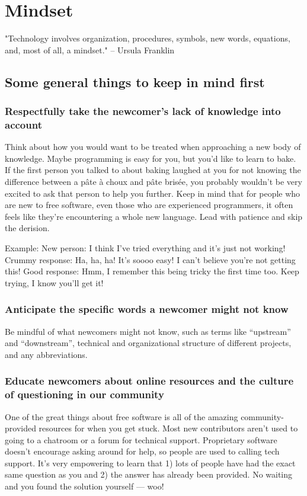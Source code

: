 \chapter{Mindset}

"Technology involves organization, procedures, symbols, new words, equations, and, most of all, a mindset." -- Ursula Franklin 

\section{Some general things to keep in mind first}

\subsection{Respectfully take the newcomer’s lack of knowledge into account}
Think about how you would want to be treated when approaching a new body of knowledge. Maybe programming is easy for you, but you’d like to learn to bake. If the first person you talked to about baking laughed at you for not knowing the difference between a pâte à choux and pâte brisée, you probably wouldn’t be very excited to ask that person to help you further. Keep in mind that for people who are new to free software, even those who are experienced programmers, it often feels like they’re encountering a whole new language. Lead with patience and skip the derision.

Example:
New person: I think I’ve tried everything and it’s just not working!
Crummy response: Ha, ha, ha! It’s soooo easy! I can’t believe you’re not getting this!
Good response: Hmm, I remember this being tricky the first time too. Keep trying, I know you’ll get it! 

\subsection{Anticipate the specific words a newcomer might not know}
Be mindful of what newcomers might not know, such as terms like “upstream” and “downstream”, technical and organizational structure of different projects, and any abbreviations.

\subsection{Educate newcomers about online resources and the culture of questioning in our community}
One of the great things about free software is all of the amazing community-provided resources for when you get stuck. Most new contributors aren’t used to going to a chatroom or a forum for technical support. Proprietary software doesn’t encourage asking around for help, so people are used to calling tech support. It’s very empowering to learn that 1) lots of people have had the exact same question as you and 2) the answer has already been provided. No waiting and you found the solution yourself — woo! 

